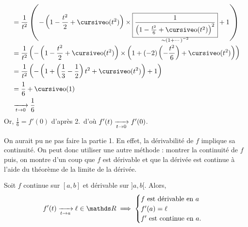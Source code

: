 \begin{enumerate}
\begin{align*}
		&= \frac{1}{t^2} \left( -\left(1-\frac{t^2}{2} + \po(t^2)\right) \times \underset{\smash{\sim (1+\cdots)^{-2}}}{\boxed{\frac{1}{\left( 1-\frac{t^2}{6} + \po(t^2) \right)^2}}} + 1 \right) \\
		&= \frac{1}{t^2} \left( -\left( 1-\frac{t^2}{2} + \po(t^2) \right) \times \left( 1 + (-2)\left( -\frac{t^2}{6} \right) + \po(t^2) \right) \right) \\
		&= \frac{1}{t^2} \left( -\left( 1 + \left( \frac{1}{3} - \frac{1}{2} \right)t^2 + \po(t^2) \right) + 1 \right) \\
		&= \frac{1}{6} + \po(1) \\
		&\tendsto{t\to 0} \frac{1}{6}
	\end{align*}
	Or, $\frac{1}{6} = f'(0)$\/ d'après 2.\ d'où $f'(t) \xrightarrow[t\to 0]{} f'(0)$.
\end{enumerate}

On aurait pu ne pas faire la partie 1. En effet, la dérivabilité de $f$\/ implique sa continuité. On peut donc utiliser une autre méthode : montrer la continuité de $f$\/ puis, on montre d'un coup que $f$\/ est dérivable et que la dérivée est continue à l'aide du théorème de la limite de la dérivée.

\begin{rap}
	Soit $f$\/ continue sur $[a,b]$\/ et dérivable sur $]a,b[$. Alors, \[
		f'(t) \tendsto{t\to a} \ell \in \R \implies \begin{cases}
			f \text{ est dérivable en } a\\
			f'(a) = \ell\\
			f' \text{ est continue en } a.
		\end{cases}
	\]
\end{rap}


